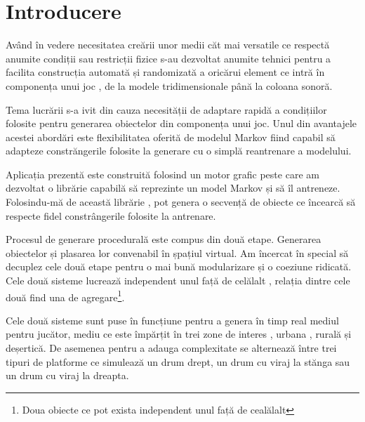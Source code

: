 \chapter*{Introducere} 

Având în vedere necesitatea creării unor medii căt mai versatile ce respectă anumite condiții sau restricții fizice s-au dezvoltat anumite tehnici pentru a facilita construcția automată și randomizată a oricărui element ce intră în componența unui joc , de la modele tridimensionale până la coloana sonoră.\par

Tema lucrării s-a ivit din cauza necesității de adaptare rapidă a condițiilor folosite pentru generarea obiectelor din componența unui joc. Unul din avantajele acestei abordări este flexibilitatea oferită de modelul Markov fiind capabil să adapteze constrăngerile folosite la generare cu o simplă reantrenare a modelului.\par

Aplicația prezentă este construită folosind un motor grafic peste care am dezvoltat o librărie capabilă să reprezinte un model Markov și să îl antreneze. Folosindu-mă de această librărie , pot genera o secvență de obiecte ce încearcă să respecte fidel constrângerile folosite la antrenare.\par

Procesul de generare procedurală este compus din două etape. Generarea obiectelor și plasarea lor convenabil în șpațiul virtual. Am încercat în special să decuplez cele două etape pentru o mai bună modularizare și o coeziune ridicată. Cele două sisteme lucrează independent unul față de celălalt , relația dintre cele două find una de agregare\footnote{Doua obiecte ce pot exista independent unul față de cealălalt}.

Cele două sisteme sunt puse în funcțiune pentru a genera în timp real mediul pentru jucător, mediu ce este împărțit în trei zone de interes , urbana , rurală și deșertică. De asemenea pentru a adauga complexitate se alternează între trei tipuri de platforme ce simulează un drum drept, un drum cu viraj la stănga sau un drum cu viraj la dreapta.\par